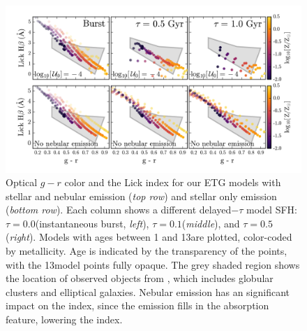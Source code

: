 \begin{figure}
  \begin{center}
    \includegraphics[width=\linewidth]{figs/f11.png}
    \caption{Optical $g-r$ color and the \hb Lick index for our ETG models with stellar and nebular emission (\emph{top row}) and stellar only emission (\emph{bottom row}). Each column shows a different delayed$-\tau$ model SFH: $\tau=0.0$\Gyr (instantaneous burst, \emph{left}), $\tau=0.1$\Gyr (\emph{middle}), and $\tau=0.5$\Gyr (\emph{right}). Models with ages between 1 and 13\Gyr are plotted, color-coded by metallicity. Age is indicated by the transparency of the points, with the 13\Gyr model points fully opaque. The grey shaded region shows the location of observed objects from \citet{Schombert+2016}, which includes globular clusters and elliptical galaxies. Nebular emission has an significant impact on the \hb index, since the emission fills in the \hb absorption feature, lowering the index.
    }
    \label{fig:LickHb}
  \end{center}
\end{figure}



